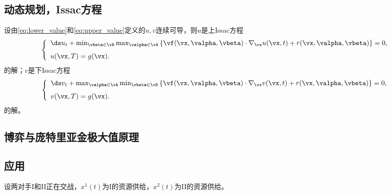 \subsection{动态规划，Issac方程}
\begin{frame}{\secname}  
  \begin{theorem}[上值函数和下值函数的偏微分方程]
  设由\eqref{eq:lower_value}和\eqref{eq:upper_value}定义的$u,v$连续可导，则$u$是上Issac方程
  \begin{equation}\label{eq:upper_issac}
  \left\{
  \begin{array}{l}
    \ds u_t + \min_{\vbeta\in\vB}\max_{\valpha\in\vA}\left\{\vf(\vx,\valpha,\vbeta)\cdot\nabla_{\vx}u(\vx,t)+r(\vx,\valpha,\vbeta)\right\}= 0, \\[.1in]
    u(\vx, T) = g(\vx). 
  \end{array}
  \right.
  \end{equation}
  的解；$v$是下Issac方程
  \begin{equation}\label{eq:lower_issac}
  \left\{
  \begin{array}{l}
    \ds v_t + \max_{\valpha\in\vA}\min_{\vbeta\in\vB}\left\{\vf(\vx,\valpha,\vbeta)\cdot\nabla_{\vx}v(\vx,t)+r(\vx,\valpha,\vbeta)\right\}= 0, \\[.1in]
    v(\vx, T) = g(\vx). 
  \end{array}
  \right.
  \end{equation}
  的解。
    \end{theorem}
\end{frame}

\subsection{博弈与庞特里亚金极大值原理}
\begin{frame}{\secname}
  
   
\end{frame}  
  
\subsection{应用}
\begin{frame}{\secname}
\begin{example}[消耗战和进攻战]
    设两对手I和II正在交战，$x^1(t)$为I的资源供给，$x^2(t)$为II的资源供给。
\end{example}
\end{frame}

